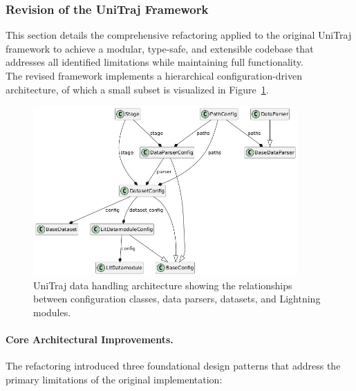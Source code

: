 \subsubsection{Revision of the UniTraj Framework}
This section details the comprehensive refactoring applied to the original UniTraj framework to achieve a modular, type-safe, and extensible codebase that addresses all identified limitations while maintaining full functionality.\\
The revised framework implements a hierarchical configuration-driven architecture, of which a small subset is visualized in Figure~\ref{fig:unitraj_data_architecture}.

\begin{figure}[htbp]
    \centering
    \includegraphics[width=0.9\textwidth]{figures/classes_DataHandling.png}
    \caption{UniTraj data handling architecture showing the relationships between configuration classes, data parsers, datasets, and Lightning modules.}
    \label{fig:unitraj_data_architecture}
\end{figure}

\paragraph{Core Architectural Improvements.}
The refactoring introduced three foundational design patterns that address the primary limitations of the original implementation:

